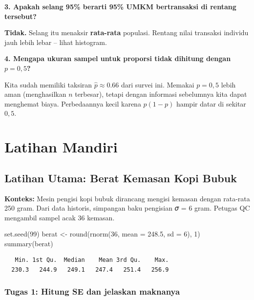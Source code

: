 \documentclass[
  indonesian,
  letterpaper,
]{book}
\newenvironment{Shaded}{\begin{snugshade}}{\end{snugshade}}
\newcommand{\AttributeTok}[1]{\textcolor[rgb]{0.40,0.45,0.13}{#1}}
\newcommand{\DecValTok}[1]{\textcolor[rgb]{0.68,0.00,0.00}{#1}}
\newcommand{\FloatTok}[1]{\textcolor[rgb]{0.68,0.00,0.00}{#1}}
\newcommand{\FunctionTok}[1]{\textcolor[rgb]{0.28,0.35,0.67}{#1}}
\newcommand{\NormalTok}[1]{\textcolor[rgb]{0.00,0.23,0.31}{#1}}
\newcommand{\OtherTok}[1]{\textcolor[rgb]{0.00,0.23,0.31}{#1}}
\begin{document}
\textbf{3. Apakah selang 95\% berarti 95\% UMKM bertransaksi di rentang
tersebut?}

\textbf{Tidak.} Selang itu menaksir \textbf{rata-rata} populasi. Rentang
nilai transaksi individu jauh lebih lebar -- lihat histogram.

\textbf{4. Mengapa ukuran sampel untuk proporsi tidak dihitung dengan
\(p = 0,5\)?}

Kita sudah memiliki taksiran \(\hat{p} \approx 0.66\) dari survei ini.
Memakai \(p = 0,5\) lebih aman (menghasilkan \(n\) terbesar), tetapi
dengan informasi sebelumnya kita dapat menghemat biaya. Perbedaannya
kecil karena \(p(1 - p)\) hampir datar di sekitar \(0,5\).


\chapter{Latihan Mandiri}\label{latihan-mandiri}

\section{Latihan Utama: Berat Kemasan Kopi
Bubuk}\label{latihan-utama-berat-kemasan-kopi-bubuk}

\textbf{Konteks:} Mesin pengisi kopi bubuk dirancang mengisi kemasan
dengan rata-rata 250 gram. Dari data historis, simpangan baku pengisian
𝜎 = 6 gram. Petugas QC mengambil sampel acak 36 kemasan.

\begin{Shaded}
\begin{Highlighting}[]
\FunctionTok{set.seed}\NormalTok{(}\DecValTok{99}\NormalTok{)}
\NormalTok{berat }\OtherTok{\textless{}{-}} \FunctionTok{round}\NormalTok{(}\FunctionTok{rnorm}\NormalTok{(}\DecValTok{36}\NormalTok{, }\AttributeTok{mean =} \FloatTok{248.5}\NormalTok{, }\AttributeTok{sd =} \DecValTok{6}\NormalTok{), }\DecValTok{1}\NormalTok{)}
\FunctionTok{summary}\NormalTok{(berat)}
\end{Highlighting}
\end{Shaded}

\begin{verbatim}
   Min. 1st Qu.  Median    Mean 3rd Qu.    Max. 
  230.3   244.9   249.1   247.4   251.4   256.9 
\end{verbatim}

\subsection{Tugas 1: Hitung SE dan jelaskan
maknanya}\label{tugas-1-hitung-se-dan-jelaskan-maknanya}
\end{document}
